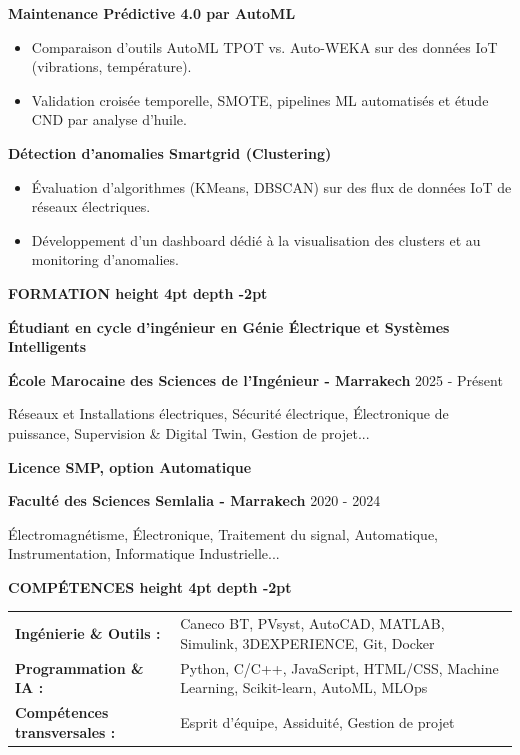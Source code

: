 \documentclass[10pt,a4paper]{altacv}
\renewcommand{\cvsection}[2][]{%
  \medskip%
  {\color{heading}\LARGE\bfseries #2 \hspace{0.2em}\leaders\vrule height 4pt depth -2pt\hfill\mbox{}}\par\smallskip
}
\renewcommand{\cvevent}[4]{%
  {\large\bfseries\color{accent}#1\par}
  \smallskip\normalsize
  \ifstrequal{#2}{}{}{%
    \textbf{\color{emphasis}#2\ifstrequal{#4}{}{}{ - #4}}%
  }%
  \hfill
  \ifstrequal{#3}{}{}{{\small#3}}%
  \par\smallskip
}
\begin{document}
{\large\bfseries\color{accent} Maintenance Prédictive 4.0 par AutoML}\\[0.05cm]
\begin{itemize}
  \item Comparaison d'outils AutoML TPOT vs. Auto-WEKA sur des données IoT (vibrations, température).
  \item Validation croisée temporelle, SMOTE, pipelines ML automatisés et étude CND par analyse d'huile.
\end{itemize}

{\large\bfseries\color{accent} Détection d'anomalies Smartgrid (Clustering)}\\[0.05cm]
\begin{itemize}
  \item Évaluation d'algorithmes (KMeans, DBSCAN) sur des flux de données IoT de réseaux électriques.
  \item Développement d'un dashboard dédié à la visualisation des clusters et au monitoring d'anomalies.
\end{itemize}

\cvsection{FORMATION}
\cvevent{Étudiant en cycle d'ingénieur en Génie Électrique et Systèmes Intelligents}{École Marocaine des Sciences de l'Ingénieur}{2025 - Présent}{Marrakech}
\small Réseaux et Installations électriques, Sécurité électrique, Électronique de puissance, Supervision \& Digital Twin, Gestion de projet...

\cvevent{Licence SMP, option Automatique}{Faculté des Sciences Semlalia}{2020 - 2024}{Marrakech}
\small Électromagnétisme, Électronique, Traitement du signal, Automatique, Instrumentation, Informatique Industrielle...

\cvsection{COMPÉTENCES}
\begin{tabular}{@{}ll@{}}
\textbf{Ingénierie \& Outils :} & Caneco BT, PVsyst, AutoCAD, MATLAB, Simulink, 3DEXPERIENCE, Git, Docker \\[2pt]
\textbf{Programmation \& IA :} & Python, C/C++, JavaScript, HTML/CSS, Machine Learning, Scikit-learn, AutoML, MLOps \\[2pt]
\textbf{Compétences transversales :} & Esprit d'équipe, Assiduité, Gestion de projet \\
\end{tabular}
\end{document}
